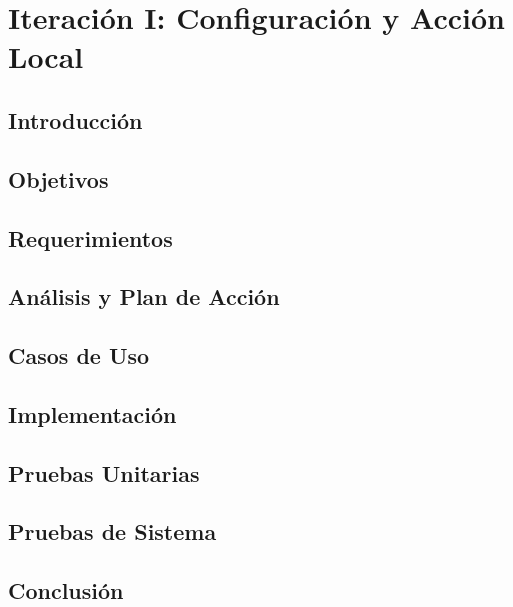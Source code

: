 
\chapter{Iteración I:  Configuración y Acción Local} %

\label{Chapter6} %


\section{Introducción}
\section{Objetivos}
\section{Requerimientos}
\section{Análisis y Plan de Acción}
\section{Casos de Uso}
\section{Implementación}
\section{Pruebas Unitarias}
\section{Pruebas de Sistema}
\section{Conclusión}